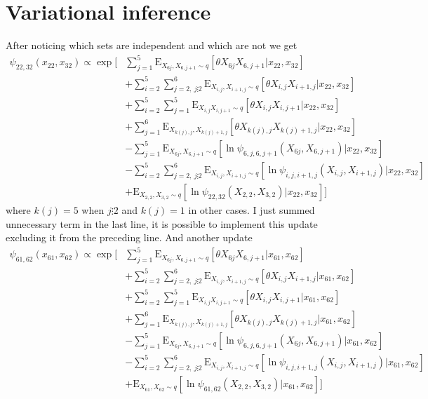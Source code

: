 \documentclass[a4paper]{article}
\begin{document}
\section{Variational inference}
After noticing which sets are independent and which are not we get
\begin{align*}
    \psi_{22, 32}(x_{22}, x_{32}) \propto \exp\biggl[  & \sum_{j=1}^5 \mathrm{E}_{X_{6j}, X_{6, j+1} \sim q} \left[ \theta X_{6j} X_{6, j+1} | x_{22}, x_{32} \right] \\
    & + \sum_{i = 2}^{5} \sum_{j = 2,\ j \vdots 2}^{6} \mathrm{E}_{X_{i, j}, X_{i + 1, j} \sim q} \left[ \theta X_{i, j} X_{i+1, j} | x_{22}, x_{32} \right] \\
    & + \sum_{i = 2}^5 \sum_{j=1}^5 \mathrm{E}_{X_{i, j} X_{i, j + 1} \sim q} \left[ \theta X_{i, j} X_{i, j + 1} | x_{22}, x_{32}\right] \\
    & + \sum_{j = 1}^6 \mathrm{E}_{X_{k(j), j}, X_{k(j) + 1, j}} \left[ \theta X_{k(j), j} X_{k(j) + 1, j} | x_{22}, x_{32}\right] \\
    & - \sum_{j=1}^5 \mathrm{E}_{X_{6j}, X_{6, j+1} \sim q} \left[ \ln \psi_{6, j, 6, j+1}(X_{6j}, X_{6, j+1}) | x_{22}, x_{32} \right] \\
    & - \sum_{i = 2}^{5} \sum_{j = 2,\ j \vdots 2}^{6} \mathrm{E}_{X_{i, j}, X_{i + 1, j} \sim q} \left[ \ln \psi_{i, j, i + 1, j}(X_{i, j}, X_{i + 1, j})  | x_{22}, x_{32} \right] \\
    & + \mathrm{E}_{X_{2, 2}, X_{3, 2} \sim q} \left[ \ln \psi_{22, 32}(X_{2, 2}, X_{3, 2})  | x_{22}, x_{32} \right]  \biggr]
\end{align*}
where $k(j) = 5$ when $j \vdots 2$ and $k(j) = 1$ in other cases. I just summed unnecessary term in the last line, it is possible to implement this
update excluding it from the preceding line. And another update
\begin{align*}
    \psi_{61, 62}(x_{61}, x_{62}) \propto \exp\biggl[  & \sum_{j=1}^5 \mathrm{E}_{X_{6j}, X_{6, j+1} \sim q} \left[ \theta X_{6j} X_{6, j+1} | x_{61}, x_{62} \right] \\
    & + \sum_{i = 2}^{5} \sum_{j = 2,\ j \vdots 2}^{6} \mathrm{E}_{X_{i, j}, X_{i + 1, j} \sim q} \left[ \theta X_{i, j} X_{i+1, j} | x_{61}, x_{62} \right] \\
    & + \sum_{i = 2}^5 \sum_{j=1}^5 \mathrm{E}_{X_{i, j} X_{i, j + 1} \sim q} \left[ \theta X_{i, j} X_{i, j + 1} | x_{61}, x_{62}\right] \\
    & + \sum_{j = 1}^6 \mathrm{E}_{X_{k(j), j}, X_{k(j) + 1, j}} \left[ \theta X_{k(j), j} X_{k(j) + 1, j} | x_{61}, x_{62}\right] \\
    & - \sum_{j=1}^5 \mathrm{E}_{X_{6j}, X_{6, j+1} \sim q} \left[ \ln \psi_{6, j, 6, j+1}(X_{6j}, X_{6, j+1}) | x_{61}, x_{62} \right] \\
    & - \sum_{i = 2}^{5} \sum_{j = 2,\ j \vdots 2}^{6} \mathrm{E}_{X_{i, j}, X_{i + 1, j} \sim q} \left[ \ln \psi_{i, j, i + 1, j}(X_{i, j}, X_{i + 1, j})  | x_{61}, x_{62} \right] \\
    & + \mathrm{E}_{X_{61}, X_{62} \sim q} \left[ \ln \psi_{61, 62}(X_{2, 2}, X_{3, 2})  | x_{61}, x_{62} \right]  \biggr]
\end{align*}
\end{document}

